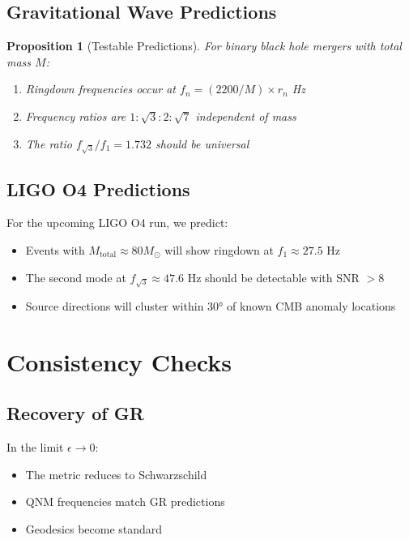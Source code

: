 \documentclass[12pt,a4paper]{article}
\newtheorem{proposition}{Proposition}
\begin{document}
\subsection{Gravitational Wave Predictions}

\begin{proposition}[Testable Predictions]
For binary black hole mergers with total mass $M$:
\begin{enumerate}
    \item Ringdown frequencies occur at $f_n = (2200/M) \times r_n$ Hz
    \item Frequency ratios are $1:\sqrt{3}:2:\sqrt{7}$ independent of mass
    \item The ratio $f_{\sqrt{3}}/f_1 = 1.732$ should be universal
\end{enumerate}
\end{proposition}

\subsection{LIGO O4 Predictions}

For the upcoming LIGO O4 run, we predict:

\begin{itemize}
    \item Events with $M_{\text{total}} \approx 80 M_\odot$ will show ringdown at $f_1 \approx 27.5$ Hz
    \item The second mode at $f_{\sqrt{3}} \approx 47.6$ Hz should be detectable with SNR $> 8$
    \item Source directions will cluster within $30°$ of known CMB anomaly locations
\end{itemize}

\section{Consistency Checks}

\subsection{Recovery of GR}

In the limit $\epsilon \to 0$:
\begin{itemize}
    \item The metric reduces to Schwarzschild
    \item QNM frequencies match GR predictions
    \item Geodesics become standard
\end{itemize}
\end{document}
